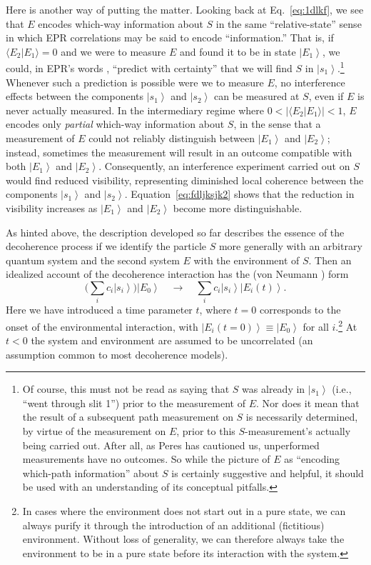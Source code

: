 \documentclass[3p,sort&compress]{elsarticle}
\newcommand{\ket}[1]{\left\vert{#1}\right\rangle}
\newcommand{\braket}[2]{\ensuremath{{\langle #1}|{#2 \rangle}}}
\providecommand{\abs}[1]{\left\lvert#1\right\rvert}
\begin{document}
Here is another way of putting the matter. Looking back at Eq.~\eqref{eq:1dlkf}, we see that $E$ encodes which-way information about $S$ in the same ``relative-state'' sense \cite{Everett:1957:rw} in which EPR correlations \cite{Einstein:1935:dr,Bell:1964:ep,Bell:1966:ph} may be said to encode ``information.'' That is, if $\braket{E_2}{E_1} = 0$ and we were to measure $E$ and found it to be in state $\ket{E_1}$, we could, in EPR's words \cite[p.~777]{Einstein:1935:dr}, ``predict with certainty'' that we will find $S$ in $\ket{s_1}$.\footnote{Of course, this must not be read as saying that $S$ was already in $\ket{s_1}$ (i.e., ``went through slit 1'') prior to the measurement of $E$. Nor does it mean that the result of a subsequent path measurement on $S$ is necessarily determined, by virtue of the measurement on $E$, prior to this $S$-measurement's actually being carried out. After all, as Peres \cite{Peres:1978:aa} has cautioned us, unperformed measurements have no outcomes. So while the picture of $E$ as ``encoding which-path information'' about $S$ is certainly suggestive and helpful, it should be used with an understanding of its conceptual pitfalls.} Whenever such a prediction is possible were we to measure $E$, no interference effects between the components $\ket{s_1}$ and $\ket{s_2}$ can be measured at $S$, even if $E$ is never actually measured. In the intermediary regime where $0 < \abs{\braket{E_2}{E_1}} < 1$, $E$ encodes only \emph{partial} which-way information about $S$, in the sense that a measurement of $E$ could not reliably distinguish between $\ket{E_1}$ and $\ket{E_2}$; instead, sometimes the measurement will result in an outcome compatible with both $\ket{E_1}$ and $\ket{E_2}$. Consequently, an interference experiment carried out on $S$ would find reduced visibility, representing diminished local coherence between the components $\ket{s_1}$ and $\ket{s_2}$. Equation~\eqref{eq:fdljksjk2} shows that the reduction in visibility increases as $\ket{E_1}$ and $\ket{E_2}$ become more distinguishable.

As hinted above, the description developed so far describes the essence of the decoherence process if we identify the particle $S$ more generally with an arbitrary quantum system and the second system $E$ with the environment of $S$. Then an idealized account of the decoherence interaction has the (von Neumann \cite{Neumann:1932:gq}) form 
%
\begin{equation}
\label{eq:d1}
\biggl( \sum_i c_i \ket{s_i} \biggr) \ket{E_0} \quad \longrightarrow \quad \sum_i c_i \ket{s_i} \ket{E_i(t)}.
\end{equation}
%
Here we have introduced a time parameter $t$, where $t=0$ corresponds to the onset of the environmental interaction, with $\ket{E_i(t=0)} \equiv \ket{E_0}$ for all $i$.\footnote{In cases where the environment does not start out in a pure state, we can always purify it through the introduction of an additional (fictitious) environment. Without loss of generality, we can therefore always take the environment to be in a pure state before its interaction with the system.} At $t<0$ the system and environment are assumed to be uncorrelated (an assumption common to most decoherence models). 
\end{document}
